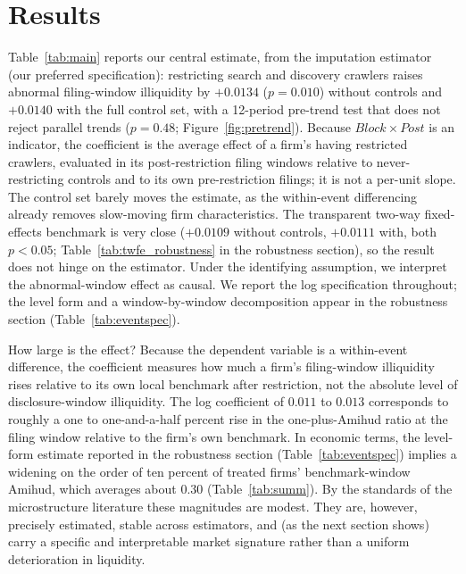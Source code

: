 \documentclass[12pt]{article}
\begin{document}
\section{Results}\label{sec:results}
Table~\ref{tab:main} reports our central estimate, from the \citet{BorusyakJaravelSpiess2024} imputation estimator (our preferred specification): restricting search and discovery crawlers raises abnormal filing-window illiquidity by $+0.0134$ ($p=0.010$) without controls and $+0.0140$ with the full control set, with a 12-period pre-trend test that does not reject parallel trends ($p=0.48$; Figure~\ref{fig:pretrend}). Because $\mathit{Block}\times\mathit{Post}$ is an indicator, the coefficient is the average effect of a firm's having restricted crawlers, evaluated in its post-restriction filing windows relative to never-restricting controls and to its own pre-restriction filings; it is not a per-unit slope. The control set barely moves the estimate, as the within-event differencing already removes slow-moving firm characteristics. The transparent two-way fixed-effects benchmark is very close ($+0.0109$ without controls, $+0.0111$ with, both $p<0.05$; Table~\ref{tab:twfe_robustness} in the robustness section), so the result does not hinge on the estimator. Under the identifying assumption, we interpret the abnormal-window effect as causal. We report the log specification throughout; the level form and a window-by-window decomposition appear in the robustness section (Table~\ref{tab:eventspec}).

How large is the effect? Because the dependent variable is a within-event difference, the coefficient measures how much a firm's filing-window illiquidity rises relative to its own local benchmark after restriction, not the absolute level of disclosure-window illiquidity. The log coefficient of $0.011$ to $0.013$ corresponds to roughly a one to one-and-a-half percent rise in the one-plus-Amihud ratio at the filing window relative to the firm's own benchmark. In economic terms, the level-form estimate reported in the robustness section (Table~\ref{tab:eventspec}) implies a widening on the order of ten percent of treated firms' benchmark-window Amihud, which averages about $0.30$ (Table~\ref{tab:summ}). By the standards of the microstructure literature these magnitudes are modest. They are, however, precisely estimated, stable across estimators, and (as the next section shows) carry a specific and interpretable market signature rather than a uniform deterioration in liquidity.
\end{document}
